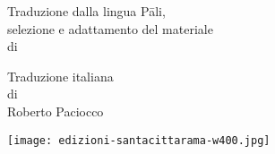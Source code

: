 \cleartorecto
\thispagestyle{empty}

\mbox{}\vfill

{\centering
\setlength{\parskip}{15pt}

{\spectralScFont\fontsize{20}{20}\selectfont \textls{\thetitle}}

\thesubtitle

\vspace*{30pt}

Traduzione dalla lingua Pāli,\\
selezione e adattamento del materiale\\
di

{\spectralScFont\fontsize{16}{16}\selectfont \textls{\theauthor}}

\vspace*{30pt}

Traduzione italiana\\
di\\
Roberto Paciocco

\vfill

\texttt{[image: edizioni-santacittarama-w400.jpg]}

}

